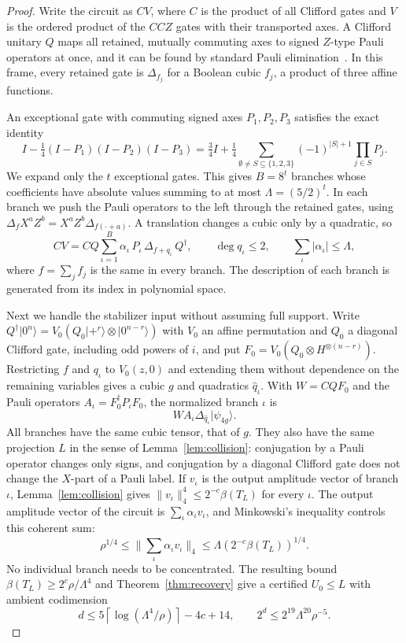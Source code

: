 \documentclass[a4paper,onecolumn,11pt,unpublished]{quantumarticle}
\theoremstyle{plain}
\theoremstyle{remark}
\newcommand{\ket}[1]{|#1\rangle}
\begin{document}
\begin{proof}
Write the circuit as $CV$, where $C$ is the product of all Clifford gates and $V$ is the ordered product of the $CCZ$ gates with their transported axes. A Clifford unitary $Q$ maps all retained, mutually commuting axes to signed $Z$-type Pauli operators at once, and it can be found by standard Pauli elimination~\cite{vdBT20}. In this frame, every retained gate is $\Delta_{f_j}$ for a Boolean cubic $f_j$, a product of three affine functions.

An exceptional gate with commuting signed axes $P_1,P_2,P_3$ satisfies the exact identity
\[
I-\tfrac14(I-P_1)(I-P_2)(I-P_3)=\tfrac34I+\tfrac14\sum_{\emptyset\neq S\subseteq\{1,2,3\}}(-1)^{|S|+1}\prod_{j\in S}P_j .
\]
We expand only the $t$ exceptional gates. This gives $B=8^t$ branches whose coefficients have absolute values summing to at most $\Lambda=(5/2)^t$. In each branch we push the Pauli operators to the left through the retained gates, using $\Delta_fX^aZ^b=X^aZ^b\Delta_{f(\cdot+a)}$. A translation changes a cubic only by a quadratic, so
\begin{equation}\label{eq:branches}
CV=CQ\sum_{\iota=1}^{B}\alpha_\iota\,P_\iota\,\Delta_{f+q_\iota}\,Q^\dagger,\qquad \deg q_\iota\le2,\qquad\sum_\iota|\alpha_\iota|\le\Lambda,
\end{equation}
where $f=\sum_jf_j$ is the same in every branch. The description of each branch is generated from its index in polynomial space.

Next we handle the stabilizer input without assuming full support. Write $Q^\dagger\ket{0^n}=V_0(Q_0\ket{+^r}\otimes\ket{0^{n-r}})$ with $V_0$ an affine permutation and $Q_0$ a diagonal Clifford gate, including odd powers of $i$, and put $F_0=V_0(Q_0\otimes H^{\otimes(n-r)})$. Restricting $f$ and $q_\iota$ to $V_0(z,0)$ and extending them without dependence on the remaining variables gives a cubic $g$ and quadratics $\hat q_\iota$. With $W=CQF_0$ and the Pauli operators $A_\iota=F_0^\dagger P_\iota F_0$, the normalized branch $\iota$ is
\[
W A_\iota\Delta_{\hat q_\iota}\ket{\psi_{4g}} .
\]
All branches have the same cubic tensor, that of $g$. They also have the same projection $L$ in the sense of Lemma~\ref{lem:collision}: conjugation by a Pauli operator changes only signs, and conjugation by a diagonal Clifford gate does not change the $X$-part of a Pauli label. If $v_\iota$ is the output amplitude vector of branch $\iota$, Lemma~\ref{lem:collision} gives $\|v_\iota\|_4^4\le2^{-c}\beta(T_L)$ for every $\iota$. The output amplitude vector of the circuit is $\sum_\iota\alpha_\iota v_\iota$, and Minkowski's inequality controls this coherent sum:
\[
\rho^{1/4}\le\Big\|\sum_\iota\alpha_\iota v_\iota\Big\|_4\le\Lambda\left(2^{-c}\beta(T_L)\right)^{1/4}.
\]
No individual branch needs to be concentrated. The resulting bound $\beta(T_L)\ge2^c\rho/\Lambda^4$ and Theorem~\ref{thm:recovery} give a certified $U_0\le L$ with ambient codimension
\[
d\le5\left\lceil\log(\Lambda^4/\rho)\right\rceil-4c+14,\qquad 2^d\le2^{19}\Lambda^{20}\rho^{-5}.
\]


\end{proof}
\end{document}

